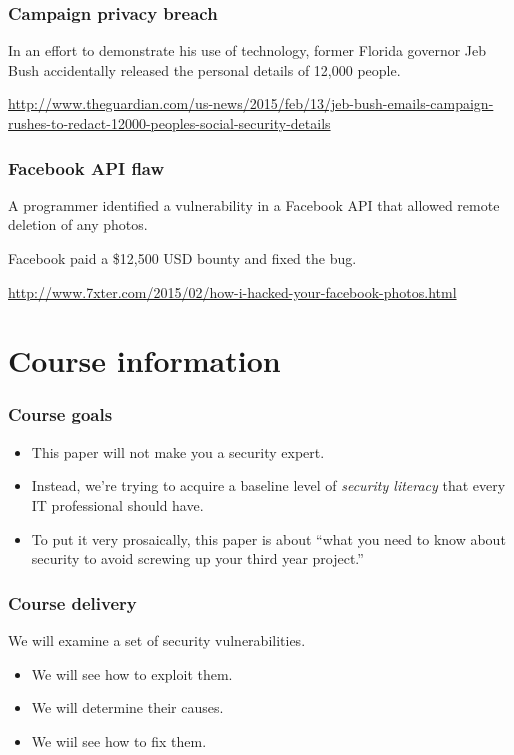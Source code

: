 \documentclass[10pt]{beamer}
\begin{document}
\begin{frame}
	\frametitle{Campaign privacy breach}

	In an effort to demonstrate his use of technology, former
	Florida governor Jeb Bush accidentally released the personal
	details of 12,000 people.

	\vspace{10mm}
	\url{http://www.theguardian.com/us-news/2015/feb/13/jeb-bush-emails-campaign-rushes-to-redact-12000-peoples-social-security-details}

\end{frame}

\begin{frame}
	\frametitle{Facebook API flaw}

	A programmer identified a vulnerability in a Facebook API
	that allowed remote deletion of any photos.

	\vspace{10mm}
	Facebook paid a \$12,500 USD bounty and fixed the bug.

	\vspace{10mm}
	\url{http://www.7xter.com/2015/02/how-i-hacked-your-facebook-photos.html}
\end{frame}
\section{Course information}
\begin{frame}
  \frametitle{Course goals}

 \begin{itemize}
  \item This paper will not make you a security expert.
  \item Instead, we're trying to acquire a baseline level of \emph{security literacy}
	  that every IT professional should have.
  \item To put it very prosaically, this paper is about ``what you need to 
	  know about security to avoid screwing up your third year project.''
  \end{itemize}
\end{frame}

\begin{frame}
	\frametitle{Course delivery}
	
	We will examine a set of security vulnerabilities.
	
	\begin{itemize}
		\item We will see how to exploit them.
		\item We will determine their causes.
		\item We wiil see how to fix them.
	\end{itemize}
\end{frame}
\end{document}
